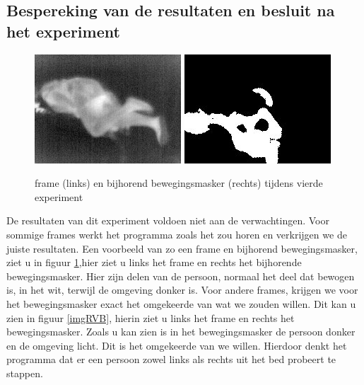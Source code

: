  \subsection{Bespereking van de resultaten en besluit na het experiment}
\label{ERefRVB}
\begin{figure}[hbp]
	\includegraphics[scale = 0.75]{VierdeExperiment_frameJuist}
	\includegraphics[scale = 0.75]{VierdeExperiment_movMaskJuist}
	\caption{frame (links) en bijhorend bewegingsmasker (rechts) tijdens vierde experiment}
	\label{imgRVBJ}
\end{figure}
De resultaten van dit experiment voldoen niet aan de verwachtingen. Voor sommige frames werkt het programma zoals het zou horen en verkrijgen we de juiste resultaten. Een voorbeeld van zo een frame en bijhorend bewegingsmasker, ziet u in figuur \ref{imgRVBJ},hier ziet u links het frame en rechts het bijhorende bewegingsmasker. Hier zijn delen van de persoon, normaal het deel dat bewogen is, in het wit, terwijl de omgeving donker is. Voor andere frames, krijgen we voor het bewegingsmasker exact het omgekeerde van wat we zouden willen. Dit kan u zien in figuur \ref{imgRVB}, 
hierin ziet u links het frame en rechts het bewegingsmasker. Zoals u kan zien is in het bewegingsmasker de persoon donker en de omgeving licht. Dit is het omgekeerde van we willen. Hierdoor denkt het programma dat er een persoon zowel links als rechts uit het bed probeert te stappen.\\
